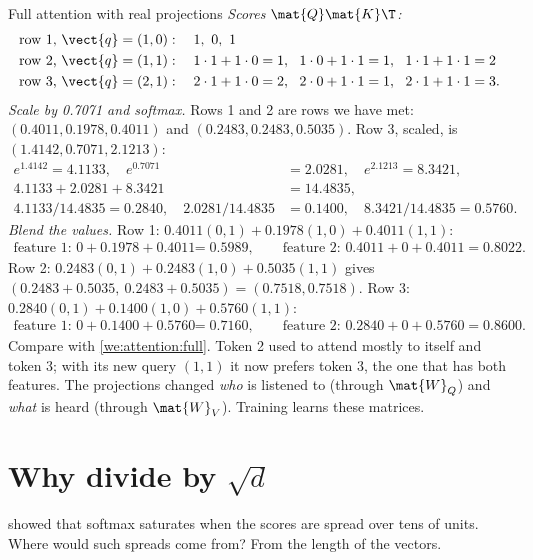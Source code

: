 \begin{worked}[label={we:attention:proj}]{Full attention with real projections}
\emph{Scores $\mat{Q}\mat{K}\T$:}
\begin{align*}
  \text{row 1, } \vect{q}=(1,0)&: \quad 1,\ 0,\ 1\\
  \text{row 2, } \vect{q}=(1,1)&: \quad 1\cdot1+1\cdot0 = 1,\ \ 1\cdot0+1\cdot1 = 1,\ \ 1\cdot1+1\cdot1 = 2\\
  \text{row 3, } \vect{q}=(2,1)&: \quad 2\cdot1+1\cdot0 = 2,\ \ 2\cdot0+1\cdot1 = 1,\ \ 2\cdot1+1\cdot1 = 3 .
\end{align*}
\emph{Scale by 0.7071 and softmax.} Rows 1 and 2 are rows we have met: $(0.4011, 0.1978,
0.4011)$ and $(0.2483, 0.2483, 0.5035)$. Row 3, scaled, is $(1.4142, 0.7071, 2.1213)$:
\begin{align*}
  e^{1.4142} = 4.1133,\quad e^{0.7071} &= 2.0281,\quad e^{2.1213} = 8.3421,\\
  4.1133 + 2.0281 + 8.3421 &= 14.4835,\\
  4.1133/14.4835 = 0.2840,\quad 2.0281/14.4835 &= 0.1400,\quad 8.3421/14.4835 = 0.5760.
\end{align*}
\emph{Blend the values.} Row 1: $0.4011(0,1) + 0.1978(1,0) + 0.4011(1,1)$:
\begin{align*}
  \text{feature 1: } 0 + 0.1978 + 0.4011 &= 0.5989,\qquad
  \text{feature 2: } 0.4011 + 0 + 0.4011 = 0.8022 .
\end{align*}
Row 2: $0.2483(0,1) + 0.2483(1,0) + 0.5035(1,1)$ gives $(0.2483 + 0.5035,\ 0.2483 + 0.5035) =
(0.7518, 0.7518)$. Row 3: $0.2840(0,1) + 0.1400(1,0) + 0.5760(1,1)$:
\begin{align*}
  \text{feature 1: } 0 + 0.1400 + 0.5760 &= 0.7160,\qquad
  \text{feature 2: } 0.2840 + 0 + 0.5760 = 0.8600 .
\end{align*}
Compare with \cref{we:attention:full}. Token 2 used to attend mostly to itself and token 3;
with its new query $(1,1)$ it now prefers token 3, the one that has both features. The projections
changed \emph{who} is listened to (through $\mat{W}_Q$) and \emph{what} is heard (through
$\mat{W}_V$). Training learns these matrices.
\end{worked}

\section[Why divide by the square root of d]{Why divide by \texorpdfstring{$\sqrt{d}$}{the square root of d}}\label{sec:attention:scale}

 showed that softmax saturates when the scores are spread over
tens of units. Where would such spreads come from? From the length of the vectors.

